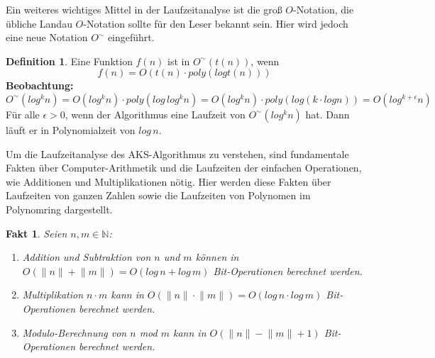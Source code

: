 \documentclass[12pt,oneside]{article}
\newtheorem{fact}[theorem]{Fakt}
\theoremstyle{remark}
\theoremstyle{definition}
\newtheorem{definition}{Definition}[section]
\begin{document}
Ein weiteres wichtiges Mittel in der Laufzeitanalyse ist die groß $O$-Notation, die übliche Landau $O$-Notation sollte für den Leser bekannt sein. Hier wird jedoch eine neue Notation $O^{\sim}$ eingeführt. 
\begin{definition}
Eine Funktion $f(n)$ ist in $ O^{\sim}(t(n))$, wenn
\begin{equation}
    f(n) = O(t(n) \cdot poly(log t(n)))
\end{equation}
\textbf{Beobachtung:}
\begin{equation}
    O^{\sim}(log^k n) = O(log^k n) \cdot poly(log \, log^k n) = O(log^k n) \cdot poly(log( k \cdot log n)) = O(log^{k+\epsilon}n)
\end{equation}
Für alle $\epsilon > 0$, wenn der Algorithmus eine Laufzeit von $O^{\sim}(log^k n)$ hat. Dann läuft er in Polynomialzeit von $log \, n$.
\end{definition}

\smallskip

Um die Laufzeitanalyse des AKS-Algorithmus zu verstehen, sind fundamentale Fakten über Computer-Arithmetik und die Laufzeiten der einfachen Operationen, wie Additionen und Multiplikationen nötig. Hier werden diese Fakten über Laufzeiten von ganzen Zahlen sowie die Laufzeiten von Polynomen im Polynomring dargestellt. 

\begin{fact}\label{fact_1}
Seien $n,m \in \mathbb{N}$:\newline
\begin{enumerate}
    \item Addition und Subtraktion von $n$ und $m$ können in $O(\lVert n \rVert + \lVert m \rVert) = O(log \, n + log \, m)$ Bit-Operationen berechnet werden.\newline
    \item Multiplikation $ n \cdot m$ kann in $O(\lVert n \rVert \cdot \lVert m \rVert) = O(log \, n \cdot log \, m)$ Bit-Operationen berechnet werden.\newline
    \item Modulo-Berechnung von $n$ mod $m$ kann in $O(\lVert n \rVert - \lVert m \rVert + 1)$ Bit-Operationen berechnet werden.\newline\newline
\end{enumerate}
\end{fact}
\end{document}
